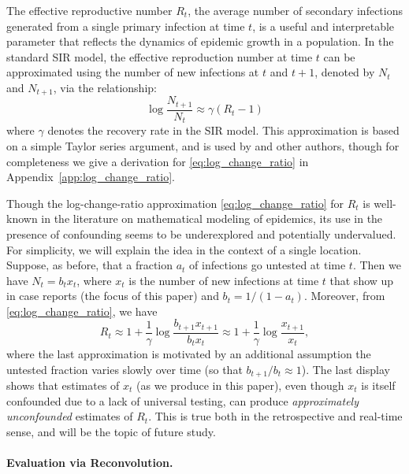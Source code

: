 \documentclass[sts]{imsart}
\theoremstyle{plain}
\theoremstyle{definition}
\theoremstyle{remark}
\begin{document}
The effective reproductive number $R_t$, the average number of secondary
infections generated from a single primary infection at time $t$, is a useful
and interpretable parameter that reflects the dynamics of epidemic growth in a  
population. In the standard SIR model, the effective reproduction number at 
time $t$ can be approximated using the number of new infections at $t$  
and $t+1$, denoted by $N_t$ and $N_{t+1}$, via the relationship: 
\begin{equation}
\label{eq:log_change_ratio}
\log \frac{N_{t+1}}{N_t} \approx \gamma (R_t - 1)  
\end{equation}
where $\gamma$ denotes the recovery rate in the SIR model. This approximation 
is based on a simple Taylor series argument, and is used by
\citet{Bettencourt:2008} and other authors, though for completeness we give
a derivation for \eqref{eq:log_change_ratio} in
Appendix~\ref{app:log_change_ratio}.

Though the log-change-ratio approximation \eqref{eq:log_change_ratio} for $R_t$
is well-known in the literature on mathematical modeling of epidemics, its use
in the presence of confounding seems to be underexplored and potentially
undervalued. For simplicity, we will explain the idea in the context of a single
location. Suppose, as before, that a fraction $a_t$ of infections go untested at
time $t$. Then we have $N_t = b_t x_t$, where $x_t$ is the number of new
infections at time $t$ that show up in case reports (the focus of this paper)
and $b_t = 1/(1-a_t)$. Moreover, from \eqref{eq:log_change_ratio}, we have
$$
R_t \approx 1 + \frac{1}{\gamma} \log \frac{b_{t+1} x_{t+1}}{b_t x_t}  
\approx 1 + \frac{1}{\gamma} \log \frac{x_{t+1}}{x_t},
$$
where the last approximation is motivated by an additional assumption the 
untested fraction varies slowly over time (so that $b_{t+1}/b_t \approx
1$). The last display shows that estimates of $x_t$ (as we produce in this
paper), even though $x_t$ is itself confounded due to a lack of universal
testing, can produce \emph{approximately unconfounded} estimates of $R_t$. This
is true both in the retrospective and real-time sense, and will be the topic of
future study.   


\smallskip
\paragraph*{Evaluation via Reconvolution.}
\end{document}
